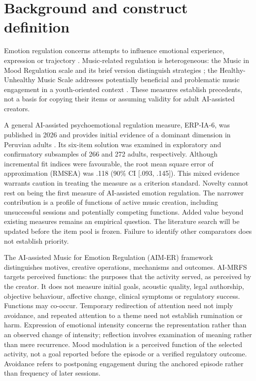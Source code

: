\section{Background and construct definition}
Emotion regulation concerns attempts to influence emotional experience, expression or trajectory \parencite{gross2015}. Music-related regulation is heterogeneous: the Music in Mood Regulation scale and its brief version distinguish strategies \parencite{saarikallio2008,saarikallio2012}; the Healthy-Unhealthy Music Scale addresses potentially beneficial and problematic music engagement in a youth-oriented context \parencite{saarikallio2015}. These measures establish precedents, not a basis for copying their items or assuming validity for adult AI-assisted creators.

A general AI-assisted psychoemotional regulation measure, ERP-IA-6, was published in 2026 and provides initial evidence of a dominant dimension in Peruvian adults \parencite{briones2026}. Its six-item solution was examined in exploratory and confirmatory subsamples of 266 and 272 adults, respectively. Although incremental fit indices were favourable, the root mean square error of approximation (RMSEA) was .118 (90\% CI [.093, .145]). This mixed evidence warrants caution in treating the measure as a criterion standard. Novelty cannot rest on being the first measure of AI-assisted emotion regulation. The narrower contribution is a profile of functions of active music creation, including unsuccessful sessions and potentially competing functions. Added value beyond existing measures remains an empirical question. The literature search will be updated before the item pool is frozen. Failure to identify other comparators does not establish priority.

The AI-assisted Music for Emotion Regulation (AIM-ER) framework distinguishes motives, creative operations, mechanisms and outcomes. AI-MRFS targets perceived functions: the purposes that the activity served, as perceived by the creator. It does not measure initial goals, acoustic quality, legal authorship, objective behaviour, affective change, clinical symptoms or regulatory success. Functions may co-occur. Temporary redirection of attention need not imply avoidance, and repeated attention to a theme need not establish rumination or harm. Expression of emotional intensity concerns the representation rather than an observed change of intensity; reflection involves examination of meaning rather than mere recurrence. Mood modulation is a perceived function of the selected activity, not a goal reported before the episode or a verified regulatory outcome. Avoidance refers to postponing engagement during the anchored episode rather than frequency of later sessions.

